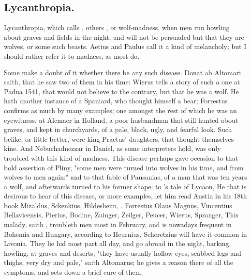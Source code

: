 \clearpage{}

\subsection{Lycanthropia.}

Lycanthropia, which \Avicenna{} calls , others ,
or wolf-madness, when men run howling about graves and fields in the night, and
will not be persuaded but that they are wolves, or some such beasts.
Aetius and Paulus call it a kind of
melancholy; but I should rather refer it to madness, as most do.

Some make a doubt of it whether there be any such disease.
Donat ab Altomari saith, that he saw two of them in his
time: Wierus tells a story of such a one at Padua 1541,
that would not believe to the contrary, but that he was a wolf. He hath another
instance of a Spaniard, who thought himself a bear;
Forrestus confirms as much by many examples; one amongst
the rest of which he was an eyewitness, at Alcmaer in Holland, a poor
husbandman that still hunted about graves, and kept in churchyards, of a pale,
black, ugly, and fearful look. Such belike, or little better, were king
Praetus' daughters, that thought themselves kine. And
Nebuchadnezzar in Daniel, as some interpreters hold, was only troubled with
this kind of madness. This disease perhaps gave occasion to that bold assertion
of Pliny, "some men were turned into wolves in his time,
and from wolves to men again:" and to that fable of Pausanias, of a man that
was ten years a wolf, and afterwards turned to his former shape: to
\Ovid{}'s tale of Lycaon, \etc{} He that is desirous to hear
of this disease, or more examples, let him read Austin in his 18th book
 Mizaldus,
 Sckenkius, 
Hildesheim, . Forrestus
 Olaus Magnus, Vincentius
Bellavicensis,  Pierius,
Bodine, Zuinger, Zeilger, Peucer, Wierus, Spranger, \etc{} This malady, saith
\Avicenna{}, troubleth men most in February, and is nowadays frequent in Bohemia
and Hungary, according to Heurnius. Scheretzius will have
it common in Livonia. They lie hid most part all day, and go abroad in the
night, barking, howling, at graves and deserts; "they have
usually hollow eyes, scabbed legs and thighs, very dry and pale,"
saith Altomarus; he gives a reason there of all the
symptoms, and sets down a brief cure of them.

